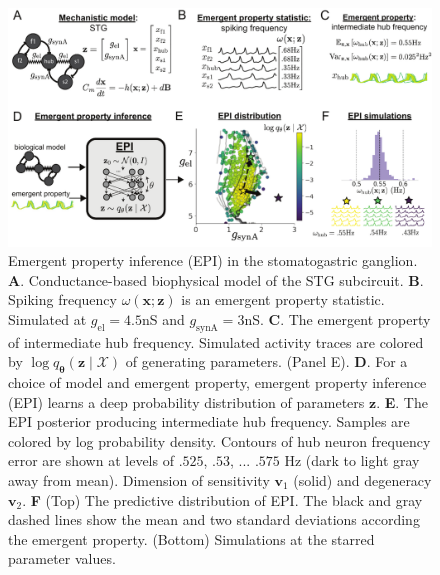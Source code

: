 \documentclass[11pt]{article}
\begin{document}
\begin{figure}
\begin{center}
\includegraphics[scale=0.8]{figures/fig1/fig1.pdf}
\end{center}
\caption{\small Emergent property inference (EPI) in the stomatogastric ganglion.  
\textbf{A}. Conductance-based biophysical model of the STG subcircuit.
\textbf{B}. Spiking frequency $\omega(\mathbf{x}; \mathbf{z})$ is an emergent property statistic. 
Simulated at $g_{\text{el}} = 4.5$nS and $g_{\text{synA}} = 3$nS.
\textbf{C}. The emergent property of intermediate hub frequency.
Simulated activity traces are colored by $\log q_{\bm{\theta}}(\mathbf{z} \mid \mathcal{X})$ of generating parameters. (Panel E).
\textbf{D}. For a choice of model and emergent property, emergent property inference (EPI) learns a deep probability distribution of parameters $\mathbf{z}$.
\textbf{E}. The EPI posterior producing intermediate hub frequency.
Samples are colored by log probability density.  
Contours of hub neuron frequency error are shown at levels of $.525$, $.53$, ... $.575$ Hz (dark to light gray away from mean).
Dimension of sensitivity $\mathbf{v}_1$ (solid) and degeneracy $\mathbf{v}_2$.
\textbf{F} (Top) The predictive distribution of EPI.
The black and gray dashed lines show the mean and two standard deviations according the emergent property.
(Bottom) Simulations at the starred parameter values.
 }
 \label{fig:STG}
\end{figure}
\end{document}
